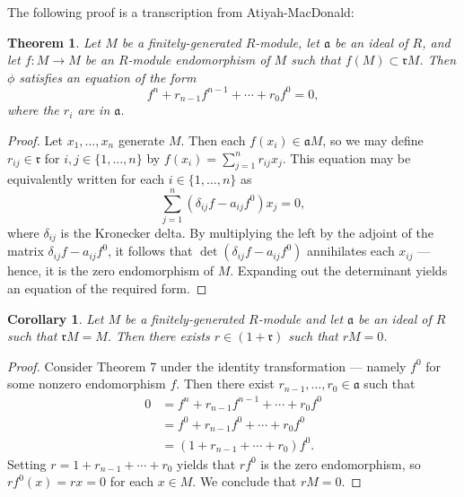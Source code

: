 \documentclass[11pt]{article}
\newtheorem{theorem}{Theorem}
\newtheorem{corollary}{Corollary}
\begin{document}
The following proof is a transcription from Atiyah-MacDonald:

\begin{adjustwidth}{0.5cm}{}
	\begin{theorem}
		Let $M$ be a finitely-generated $R$-module, let $\mathfrak{a}$ be an ideal of $R$, and let $f : M \to M$ be an $R$-module endomorphism of $M$ such that $f(M) \subset \mathfrak{r}M$. Then $\phi$ satisfies an equation of the form
		\[
			f^{n} + r_{n - 1} f^{n - 1} + \cdots + r_{0} f^{0} = 0,
		\]
		where the $r_{i}$ are in $\mathfrak{a}$.
	\end{theorem}
	\begin{proof}
		Let $x_{1}, \ldots, x_{n}$ generate $M$. Then each $f(x_{i}) \in \mathfrak{a} M$, so we may define $r_{ij} \in \mathfrak{r}$ for $i, j \in \{ 1, \ldots, n \}$ by $f(x_{i}) = \sum_{j = 1}^{n} r_{ij}x_{j}$. This equation may be equivalently written for each $i \in \{ 1, \ldots, n \}$ as
		\[
			\sum\limits_{j = 1}^{n} (\delta_{ij} f - a_{ij} f^{0}) x_{j} = 0,
		\]
		where $\delta_{ij}$ is the Kronecker delta. By multiplying the left by the adjoint of the matrix $\delta_{ij} f - a_{ij} f^{0}$, it follows that $\det(\delta_{ij} f - a_{ij} f^{0})$ annihilates each $x_{ij}$ --- hence, it is the zero endomorphism of $M$. Expanding out the determinant yields an equation of the required form.
	\end{proof}
\end{adjustwidth}

\begin{adjustwidth}{0.5cm}{}
	\begin{corollary}
		Let $M$ be a finitely-generated $R$-module and let $\mathfrak{a}$ be an ideal of $R$ such that $\mathfrak{r} M = M$. Then there exists $r \in (1 + \mathfrak{r})$ such that $rM = 0$.
	\end{corollary}
	\begin{proof}
		Consider Theorem 7 under the identity transformation --- namely $f^{0}$ for some nonzero endomorphism $f$. Then there exist $r_{n - 1}, \ldots, r_{0} \in \mathfrak{a}$ such that
		\begin{align*}
			0 &= f^{n} + r_{n - 1} f^{n - 1} + \cdots + r_{0} f^{0} \\
			&= f^{0} + r_{n - 1} f^{0} + \cdots + r_{0} f^{0} \\
			&= (1 + r_{n - 1} + \cdots + r_{0}) f^{0}.
		\end{align*}
		Setting $r = 1 + r_{n - 1} + \cdots + r_{0}$ yields that $r f^{0}$ is the zero endomorphism, so $r f^{0}(x) = rx = 0$ for each $x \in M$. We conclude that $rM = 0$.
	\end{proof}
\end{adjustwidth}
\end{document}
